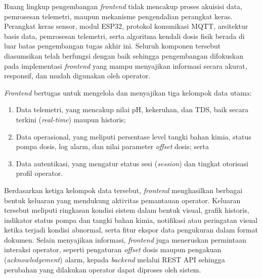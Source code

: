 Ruang lingkup pengembangan \textit{frontend} tidak mencakup proses akuisisi data,
pemrosesan telemetri, maupun mekanisme pengendalian perangkat keras. Perangkat
keras sensor, modul ESP32, protokol komunikasi MQTT, arsitektur basis data,
pemrosesan telemetri, serta algoritma kendali dosis fisik berada di luar batas
pengembangan tugas akhir ini. Seluruh komponen tersebut diasumsikan telah
berfungsi dengan baik sehingga pengembangan difokuskan pada implementasi
\textit{frontend} yang mampu menyajikan informasi secara akurat, responsif, dan
mudah digunakan oleh operator.

\textit{Frontend} bertugas untuk mengelola dan menyajikan tiga kelompok data utama:
\begin{enumerate}
    \item Data telemetri, yang mencakup nilai pH, kekeruhan, dan TDS, baik secara
    terkini (\textit{real-time}) maupun historis;
    \item Data operasional, yang meliputi persentase level tangki bahan kimia,
    status pompa dosis, log alarm, dan nilai parameter \textit{offset} dosis; serta
    \item Data autentikasi, yang mengatur status sesi (\textit{session}) dan tingkat
    otorisasi profil operator.
\end{enumerate}

Berdasarkan ketiga kelompok data tersebut, \textit{frontend} menghasilkan berbagai
bentuk keluaran yang mendukung aktivitas pemantauan operator. Keluaran tersebut
meliputi ringkasan kondisi sistem dalam bentuk visual, grafik historis, indikator
status pompa dan tangki bahan kimia, notifikasi atau peringatan visual ketika
terjadi kondisi abnormal, serta fitur ekspor data pengukuran dalam format dokumen.
Selain menyajikan informasi, \textit{frontend} juga meneruskan permintaan interaksi
operator, seperti pengaturan \textit{offset} dosis maupun pengakuan (\textit{acknowledgement})
alarm, kepada \textit{backend} melalui REST API sehingga perubahan yang dilakukan
operator dapat diproses oleh sistem.


